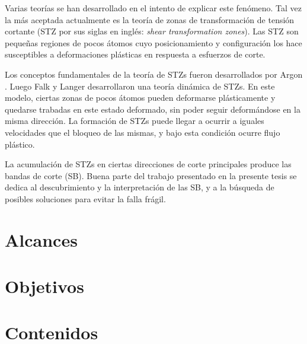 Varias teorías se han desarrollado en el intento de explicar este fenómeno. Tal vez la más aceptada actualmente es la teoría de zonas de transformación de tensión cortante (STZ por sus siglas en inglés: \textit{shear transformation zones}). Las STZ son pequeñas regiones de pocos átomos cuyo posicionamiento y configuración los hace susceptibles a deformaciones plásticas en respuesta a esfuerzos de corte.

Los conceptos fundamentales de la teoría de STZs fueron desarrollados por Argon \citep{argon79}. Luego Falk y Langer \citep{Falk98, Langer07} desarrollaron una teoría dinámica de STZs. En este modelo, ciertas zonas de pocos átomos pueden deformarse plásticamente y quedarse trabadas en este estado deformado, sin poder seguir deformándose en la misma dirección. La formación de STZs puede llegar a ocurrir a iguales velocidades que el bloqueo de las mismas, y bajo esta condición ocurre flujo plástico.

La acumulación de STZs en ciertas direcciones de corte principales produce las bandas de corte (SB). Buena parte del trabajo presentado en la presente tesis se dedica al descubrimiento y la interpretación de las SB, y a la búsqueda de posibles soluciones para evitar la falla frágil.



\section{Alcances}
\label{S1_6}



\section{Objetivos}
\label{S1_7}


\section{Contenidos}
\label{S1_8}

